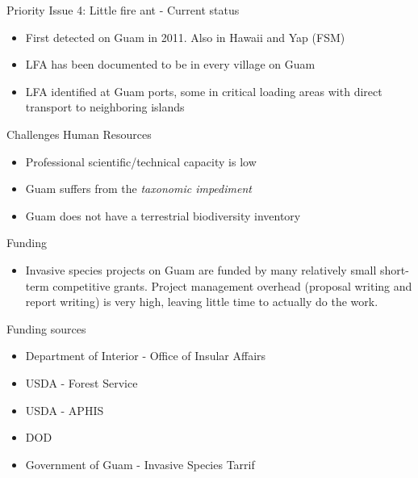 \documentclass[]{beamer}
\begin{document}
\begin{frame}{Priority Issue 4: Little fire ant - Current status}	
	\begin{itemize}
		\item First detected on Guam in 2011. Also in Hawaii and Yap (FSM)
		\item LFA has been documented to be in every village on Guam
		\item LFA identified at Guam ports, some in critical loading  areas with direct transport to neighboring islands
	\end{itemize}
\end{frame}

\begin{frame}{Challenges}
	Human Resources
	\begin{itemize}
		\item Professional scientific/technical capacity is low
		\item Guam suffers from the \textit{taxonomic impediment}
		\item Guam does not have a terrestrial biodiversity inventory
	\end{itemize}
	Funding
	\begin{itemize}
		\item Invasive species projects on Guam are funded by many relatively small short-term competitive grants. Project management overhead (proposal writing and report writing) is very high, leaving little time to actually do the work.
	\end{itemize}
\end{frame}

\begin{frame}{Funding sources}
	\begin{itemize}
	   \item Department of Interior - Office of Insular Affairs
	   \item USDA - Forest Service
	   \item USDA - APHIS
	   \item DOD
	   \item Government of Guam - Invasive Species Tarrif
	\end{itemize}		
\end{frame}
\end{document}
